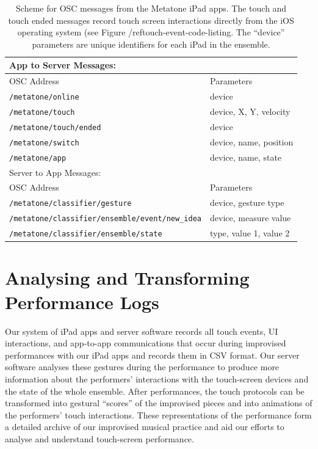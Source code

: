 \documentclass[graybox]{svmult}
\begin{document}
\begin{table}
  \begin{center}
  \begin{tabular}{|l|l|}
  \hline
  App to Server Messages: &\\
  \hline
  OSC Address           & Parameters \\ 
  \hline
  \texttt{/metatone/online}      & device  \\     
  \texttt{/metatone/touch}       & device, X, Y, velocity \\
  \texttt{/metatone/touch/ended} & device \\  
  \texttt{/metatone/switch}      & device, name, position\\
  \texttt{/metatone/app}         & device, name, state\\
  \hline
  Server to App Messages:&\\
  \hline
  OSC Address           & Parameters \\ \hline
  \texttt{/metatone/classifier/gesture} & device, gesture type\\
  \texttt{/metatone/classifier/ensemble/event/new\_idea} & device, measure value\\
  \texttt{/metatone/classifier/ensemble/state} & type, value 1, value 2 \\
  \hline
  \end{tabular}
\end{center}
\caption{Scheme for OSC messages from the Metatone iPad apps. The
  touch and touch ended messages record touch screen interactions
  directly from the iOS operating system (see Figure
  /ref{touch-event-code-listing}. 
  The ``device'' parameters are unique identifiers for each iPad in
  the ensemble.
}
  \label{oscschema} 
\end{table}

\section{Analysing and Transforming Performance Logs}
\label{sec:analysis}

Our system of iPad apps and server software records all touch events,
UI interactions, and app-to-app communications that occur during
improvised performances with our iPad apps and records them in CSV
format. Our server software analyses these gestures during the
performance to produce more information about the performers'
interactions with the touch-screen devices and the state of the whole
ensemble. After performances, the touch protocols can be transformed
into gestural ``scores'' of the improvised pieces and into animations
of the performers' touch interactions. These representations of the
performance form a detailed archive of our improvised musical practice
and aid our efforts to analyse and understand touch-screen performance.
\end{document}
